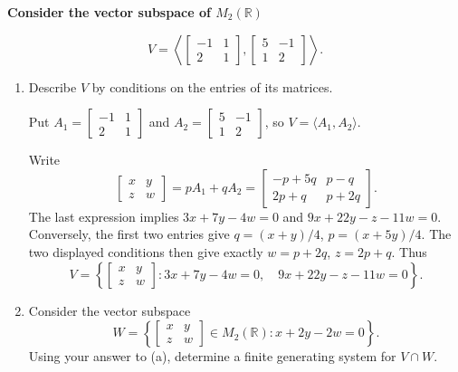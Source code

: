 \providecommand{\rank}{\operatorname{r}}
\providecommand{\RR}{\mathbb R}
\providecommand{\CC}{\mathbb C}
\providecommand{\KK}{\mathbb K}

\setcounter{enumi}{76}
\item {\bfseries\boldmath
Consider the vector subspace of $M_2(\RR)$
}

\[
V=\left\langle\begin{bmatrix}-1&1\\2&1\end{bmatrix},\begin{bmatrix}5&-1\\1&2\end{bmatrix}\right\rangle.
\]

\begin{enumerate}[label=\alph*)]

\item Describe $V$ by conditions on the entries of its matrices.

\begin{answer}
Put $A_1=\begin{bmatrix}-1&1\\2&1\end{bmatrix}$ and
$A_2=\begin{bmatrix}5&-1\\1&2\end{bmatrix}$, so $V=\langle A_1,A_2\rangle$.

Write
\[
 \begin{bmatrix}x&y\\z&w\end{bmatrix}=pA_1+qA_2
 =\begin{bmatrix}-p+5q&p-q\\2p+q&p+2q\end{bmatrix}.
\]
The last expression implies $3x+7y-4w=0$ and $9x+22y-z-11w=0$.
Conversely, the first two entries give
$q=(x+y)/4$, $p=(x+5y)/4$.
The two displayed conditions then give exactly $w=p+2q$, $z=2p+q$.
Thus
\[
 V=\left\{\begin{bmatrix}x&y\\z&w\end{bmatrix}:
 3x+7y-4w=0,\quad9x+22y-z-11w=0\right\}.
\]
\end{answer}

\item Consider the vector subspace
\[
W=\left\{\begin{bmatrix}x&y\\z&w\end{bmatrix}\in M_2(\RR):x+2y-2w=0\right\}.
\]
Using your answer to (a), determine a finite generating system for $V\cap W$.


\end{enumerate}

